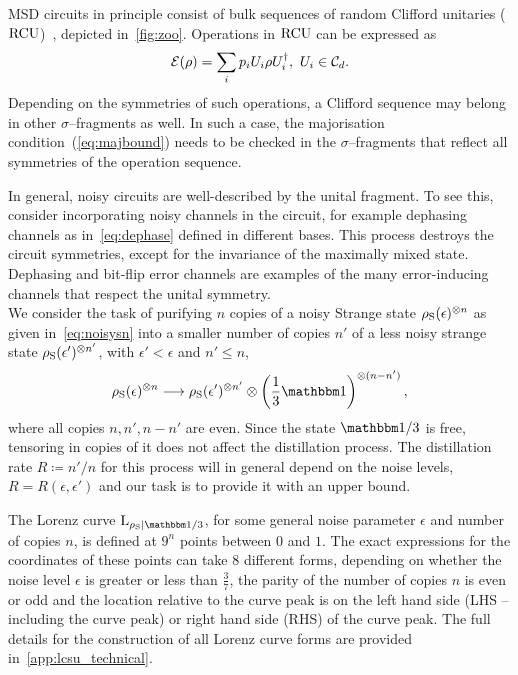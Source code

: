 \documentclass[pra,
aps,
twocolumn,
superscriptaddress,
groupedaddress,
nofootinbib,
reprint
]{revtex4-1}
\begin{document}
MSD circuits in principle consist of bulk sequences of random Clifford unitaries (${\rm{RCU}}$)~\cite{cit:bravyi}, depicted in~\cref{fig:zoo}.
Operations in ${\rm{RCU}}$ can be expressed as
\begin{equation}
    \mathcal{E}(\rho) = \sum_i p_i U_i \rho U_i^\dagger,\ U_i \in \mathcal{C}_d.
\end{equation}
Depending on the symmetries of such operations, a Clifford sequence may belong in other $\sigma$--fragments as well.
In such a case, the majorisation condition~(\ref{eq:majbound}) needs to be checked in the $\sigma$--fragments that reflect all symmetries of the operation sequence.

In general, noisy circuits are well-described by the unital fragment.
To see this, consider incorporating noisy channels in the circuit, for example dephasing channels as in~\cref{eq:dephase} defined in different bases.
This process destroys the circuit symmetries, except for the invariance of the maximally mixed state.
Dephasing and bit-flip error channels are examples of the many error-inducing channels that respect the unital symmetry. 
\null\\

We consider the task of purifying $n$ copies of a noisy Strange state $\rho_{\rm{S}}(\epsilon)^{\otimes n}$ as given in~\cref{eq:noisysn} into a smaller number of copies $n'$ of a less noisy strange state $\rho_{\rm{S}}(\epsilon')^{\otimes n'}$, with $\epsilon' < \epsilon$ and $n' \leq n$,
\begin{equation}\label{eq:sudist}
	\rho_{\rm{S}}(\epsilon)^{\otimes n} \longrightarrow \rho_{\rm{S}}(\epsilon')^{\otimes n'} \otimes \left( \frac{1}{3}\id \right)^{\otimes (n-n')},
\end{equation}
where all copies $n, n', n - n'$ are even.
Since the state $\id / 3$ is free, tensoring in copies of it does not affect the distillation process.
The distillation rate $R \coloneqq n'/n$ for this process will in general depend on the noise levels, $R = R(\epsilon, \epsilon')$ and our task is to provide it with an upper bound.

The Lorenz curve $\lc{\rho_{\rm{S}}}{\id/3}$, for some general noise parameter $\epsilon$ and number of copies $n$, is defined at $9^n$ points between $0$ and $1$.
The exact expressions for the coordinates of these points can take $8$ different forms, depending on whether the noise level $\epsilon$ is greater or less than $\frac{3}{7}$, the parity of the number of copies $n$ is even or odd and the location relative to the curve peak is on the left hand side (LHS -- including the curve peak) or right hand side (RHS) of the curve peak.
The full details for the construction of all Lorenz curve forms are provided in~\cref{app:lcsu_technical}.
\end{document}
